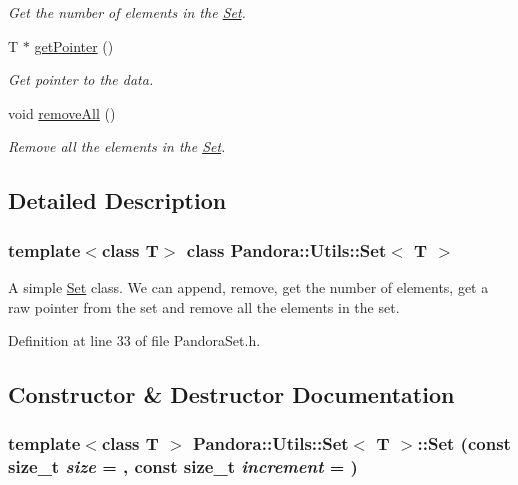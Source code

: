 \begin{DoxyCompactItemize}
\begin{DoxyCompactList}\small\item\em Get the number of elements in the \hyperlink{classPandora_1_1Utils_1_1Set}{Set}. \item\end{DoxyCompactList}\item 
T $\ast$ \hyperlink{classPandora_1_1Utils_1_1Set_a57d191182540ce79e9a0db1cf52ddd10}{getPointer} ()
\begin{DoxyCompactList}\small\item\em Get pointer to the data. \item\end{DoxyCompactList}\item 
void \hyperlink{classPandora_1_1Utils_1_1Set_aa134d362ed2baacc3ca0864cb6f10cb7}{removeAll} ()
\begin{DoxyCompactList}\small\item\em Remove all the elements in the \hyperlink{classPandora_1_1Utils_1_1Set}{Set}. \item\end{DoxyCompactList}\end{DoxyCompactItemize}


\subsection{Detailed Description}
\subsubsection*{template$<$class T$>$ class Pandora::Utils::Set$<$ T $>$}

A simple \hyperlink{classPandora_1_1Utils_1_1Set}{Set} class. We can append, remove, get the number of elements, get a raw pointer from the set and remove all the elements in the set. 

Definition at line 33 of file PandoraSet.h.

\subsection{Constructor \& Destructor Documentation}
\hypertarget{classPandora_1_1Utils_1_1Set_ad0e4e02f649fcefffe61115758e1261c}{
\subsubsection[{Set}]{\setlength{\rightskip}{0pt plus 5cm}template$<$class T $>$ {\bf Pandora::Utils::Set}$<$ T $>$::{\bf Set} (const size\_\-t {\em size} = {}, \/  const size\_\-t {\em increment} = {})}}
\label{classPandora_1_1Utils_1_1Set_ad0e4e02f649fcefffe61115758e1261c}


